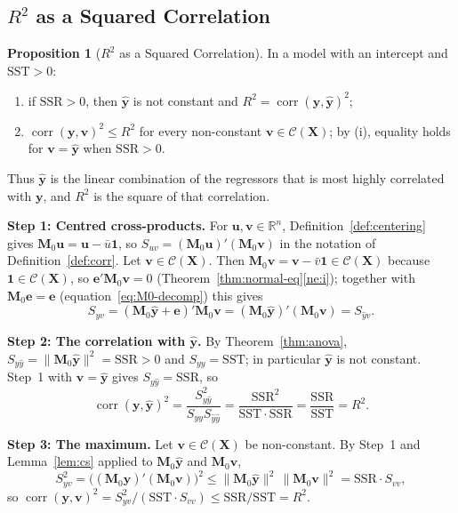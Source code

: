\documentclass[12pt,a4paper]{article}
\makeatletter
\theoremstyle{definition}
\newtheorem{proposition}[theorem]{Proposition}
\renewenvironment{proof}[1][\proofname]{\par
  \pushQED{\qed}%
  \normalfont \topsep6\p@\@plus6\p@\relax
  \trivlist
  \item[\hskip\labelsep\bfseries #1\@addpunct{.}]\ignorespaces
}{%
  \popQED\endtrivlist\@endpefalse
}
\DeclareMathOperator\corr{corr}
\newcommand{\SST}{\mathrm{SST}}
\newcommand{\SSR}{\mathrm{SSR}}
\newcommand{\bX}{\mathbf{X}}
\newcommand{\by}{\mathbf{y}}
\newcommand{\bM}{\mathbf{M}}
\newcommand{\bone}{\mathbf{1}}
\newcommand{\bv}{\mathbf{v}}
\newcommand{\Real}{\mathbb{R}}
\newcommand{\calC}{\mathcal{C}}
\newcommand{\bu}{\mathbf{u}}
\makeatother
\begin{document}
\subsection{\texorpdfstring{$R^2$}{R2} as a Squared Correlation}

\begin{proposition}[$R^2$ as a Squared Correlation]\label{prop:R2-corr}
In a model with an intercept and $\SST > 0$:
\begin{enumerate}[label=\textup{(\roman*)}]
\item if $\SSR > 0$, then $\hat{\by}$ is not constant and $R^2 = \corr(\by, \hat{\by})^2$;
\item $\corr(\by, \bv)^2 \leqslant R^2$ for every non-constant $\bv \in \calC(\bX)$; by (i), equality holds for $\bv = \hat{\by}$ when $\SSR > 0$.
\end{enumerate}
Thus $\hat{\by}$ is the linear combination of the regressors that is most highly correlated with $\by$, and $R^2$ is the square of that correlation.
\end{proposition}

\begin{proof}
\textbf{Step 1: Centred cross-products.} For $\bu, \bv \in \Real^n$, Definition~\ref{def:centering} gives $\bM_0\bu = \bu - \bar u\bone$, so $S_{uv} = (\bM_0\bu)'(\bM_0\bv)$ in the notation of Definition~\ref{def:corr}. Let $\bv \in \calC(\bX)$. Then $\bM_0\bv = \bv - \bar v\bone \in \calC(\bX)$ because $\bone \in \calC(\bX)$, so $\mathbf{e}'\bM_0\bv = 0$ (Theorem~\ref{thm:normal-eq}\ref{ne:i}); together with $\bM_0\mathbf{e} = \mathbf{e}$ (equation~\eqref{eq:M0-decomp}) this gives
\[
S_{yv} = (\bM_0\hat{\by} + \mathbf{e})'\bM_0\bv = (\bM_0\hat{\by})'(\bM_0\bv) = S_{\hat y v}.
\]

\textbf{Step 2: The correlation with $\hat{\by}$.} By Theorem~\ref{thm:anova}, $S_{\hat y\hat y} = \|\bM_0\hat{\by}\|^2 = \SSR > 0$ and $S_{yy} = \SST$; in particular $\hat{\by}$ is not constant. Step~1 with $\bv = \hat{\by}$ gives $S_{y\hat y} = \SSR$, so
\[
\corr(\by, \hat{\by})^2 = \frac{S_{y\hat y}^2}{S_{yy}S_{\hat y\hat y}} = \frac{\SSR^2}{\SST\cdot\SSR} = \frac{\SSR}{\SST} = R^2.
\]

\textbf{Step 3: The maximum.} Let $\bv \in \calC(\bX)$ be non-constant. By Step~1 and Lemma~\ref{lem:cs} applied to $\bM_0\hat{\by}$ and $\bM_0\bv$,
\[
S_{yv}^2 = \bigl((\bM_0\hat{\by})'(\bM_0\bv)\bigr)^2 \leqslant \|\bM_0\hat{\by}\|^2\,\|\bM_0\bv\|^2 = \SSR\cdot S_{vv},
\]
so $\corr(\by, \bv)^2 = S_{yv}^2/(\SST\cdot S_{vv}) \leqslant \SSR/\SST = R^2$.
\end{proof}
\end{document}
